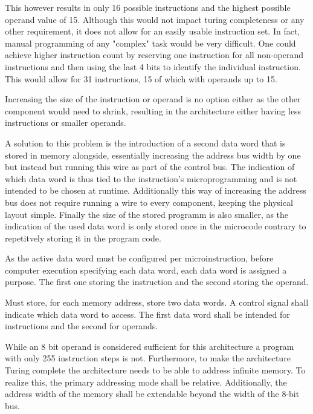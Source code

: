This however results in only 16 possible instructions and the highest possible operand value of 15. Although this would not impact turing completeness or any other requirement, it does not allow for an easily usable instruction set. In fact, manual programming of any "complex" task would be very difficult. One could achieve higher instruction count by reserving one instruction for all non-operand instructions and then using the last 4 bits to identify the individual instruction. This would allow for 31 instructions, 15 of which with operands up to 15.

Increasing the size of the instruction or operand is no option either as the other component would need to shrink, resulting in the architecture either having less instructions or smaller operands.

A solution to this problem is the introduction of a second data word that is stored in memory alongside, essentially increasing the address bus width by one but instead but running this wire as part of the control bus. The indication of which data word is thus tied to the instruction's microprogramming and is not intended to be chosen at runtime. Additionally this way of increasing the address bus does not require running a wire to every component, keeping the physical layout simple. Finally the size of the stored programm is also smaller, as the indication of the used data word is only stored once in the microcode contrary to repetitvely storing it in the program code.  

As the active data word must be configured per microinstruction, before computer execution specifying each data word, each data word is assigned a purpose. The first one storing the instruction and the second storing the operand.    

\begin{feat-requirement}
Must store, for each memory address, store two data words. A control signal shall indicate which data word to access. The first data word shall be intended for instructions and the second for operands.
\end{feat-requirement}

While an 8 bit operand is considered sufficient for this architecture a program with only 255 instruction steps is not. Furthermore, to make the architecture Turing complete the architecture needs to be able to address infinite memory. To realize this, the primary addressing mode shall be relative. Additionally, the address width of the memory shall be extendable beyond the width of the 8-bit bus.

